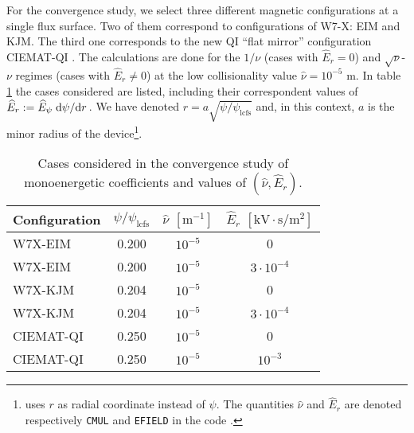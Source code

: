 For the convergence study, we select three different magnetic configurations at a single flux surface. Two of them correspond to configurations of W7-X: EIM and KJM. The third one corresponds to the new QI ``flat mirror'' \cite{velasco2023robust} configuration CIEMAT-QI \cite{Sanchez_2023}. The calculations are done for the $1/\nu$ (cases with $\widehat{E}_r=0$) and $\sqrt{\nu}$-$\nu$ regimes \cite{dherbemont2022} (cases with $\widehat{E}_r\ne 0$) at the low collisionality value $\hat{\nu}=10^{-5}$ m. In table \ref{tab:Convergence_cases} the cases considered are listed, including their correspondent values of $\widehat{E}_r:= \widehat{E}_\psi\dv*{\psi}{r}$. We have denoted $r = a \sqrt{\psi/\psi_{\text{lcfs}}}$ and, in this context, $a$ is the minor radius of the device\footnote{{\DKES} uses $r$ as radial coordinate instead of $\psi$. The quantities $\hat{\nu}$ and $\widehat{E}_r$ are denoted respectively \texttt{CMUL} and \texttt{EFIELD} in the code {\DKES}.}.
\begin{table}[h]
	\centering
	\begin{tabular}{@{}lccc@{}}
		\toprule
		Configuration & $\psi/\psi_{\text{lcfs}}$ & $\hat{\nu}$ $[\text{m}^{-1}]$ & $\widehat{E}_r$  $[\text{kV}\cdot\text{s}/\text{m}^2]$   \\ \midrule
		W7X-EIM       & 0.200                     & $10^{-5}$   & 0 \\
		W7X-EIM       & 0.200                     & $10^{-5}$   & $3\cdot10^{-4}$ \\
		W7X-KJM       & 0.204                     & $10^{-5}$   & 0 \\
		W7X-KJM       & 0.204                     & $10^{-5}$   & $3\cdot10^{-4}$ \\ 
		CIEMAT-QI     & 0.250                     & $10^{-5}$   & 0       \\
		CIEMAT-QI     & 0.250                     & $10^{-5}$   & $10^{-3}$       \\
		\bottomrule
	\end{tabular}
	\caption{Cases considered in the convergence study of monoenergetic coefficients and values of $(\hat{\nu},\widehat{E}_r)$.}
	\label{tab:Convergence_cases}
\end{table}

